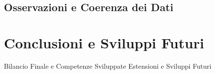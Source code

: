 \documentclass[a4paper,12pt]{report}
\begin{document}
\section{Osservazioni e Coerenza dei Dati}



\chapter*{Conclusioni e Sviluppi Futuri}

Bilancio Finale e Competenze Sviluppate
Estensioni e Sviluppi Futuri
\end{document}
